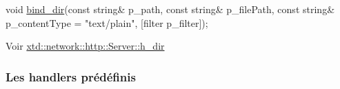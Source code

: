 \begin{DoxyItemize}
\item 
\begin{DoxyCode}
\textcolor{keywordtype}{void} \hyperlink{classxtd_1_1network_1_1http_1_1Server_a9c5984fbcd1ea24860660a670250cb36}{bind\_dir}(\textcolor{keyword}{const} \textcolor{keywordtype}{string}& p\_path,
              \textcolor{keyword}{const} \textcolor{keywordtype}{string}& p\_filePath,
              \textcolor{keyword}{const} \textcolor{keywordtype}{string}& p\_contentType = \textcolor{stringliteral}{"text/plain"},
              [filter            p\_filter]);
\end{DoxyCode}
 \par
\par
 Voir \hyperlink{classxtd_1_1network_1_1http_1_1Server_a71d7415223786f5451ef36f62c91782e}{xtd\-::network\-::http\-::\-Server\-::h\-\_\-dir} \par
\par

\end{DoxyItemize}

\subsubsection*{Les handlers prédéfinis }


